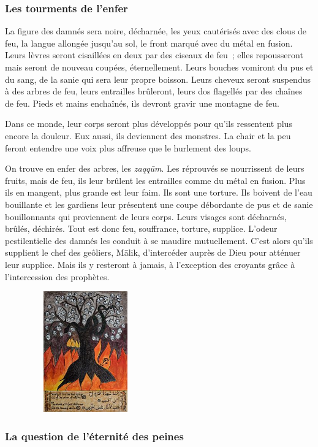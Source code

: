  
\subsubsection{Les tourments de
l'enfer}\label{les-tourments-de-lenfer}

La figure des damnés sera noire, décharnée, les yeux cautérisés avec des
clous de feu, la langue allongée jusqu'au sol, le front marqué avec du
métal en fusion. Leurs lèvres seront cisaillées en deux par des ciseaux
de feu~; elles repousseront mais seront de nouveau coupées,
éternellement. Leurs bouches vomiront du pus et du sang, de la sanie qui
sera leur propre boisson. Leurs cheveux seront suspendus à des arbres de
feu, leurs entrailles brûleront, leurs dos flagellés par des chaînes de
feu. Pieds et mains enchaînés, ils devront gravir une montagne de feu.

Dans ce monde, leur corps seront plus développés pour qu'ils ressentent
plus encore la douleur. Eux aussi, ils deviennent des monstres. La chair
et la peu feront entendre une voix plus affreuse que le hurlement des
loups.

On trouve en enfer des arbres, les \emph{zaqqūm}. Les réprouvés se
nourrissent de leurs fruits, mais de feu, ils leur brûlent les
entrailles comme du métal en fusion. Plus ils en mangent, plus grande
est leur faim. Ils sont une torture. Ils boivent de l'eau bouillante et
les gardiens leur présentent une coupe débordante de pus et de sanie
bouillonnants qui proviennent de leurs corps. Leurs visages sont
décharnés, brûlés, déchirés. Tout est donc feu, souffrance, torture,
supplice. L'odeur pestilentielle des damnés les conduit à se maudire
mutuellement. C'est alors qu'ils supplient le chef des geôliers, Mālik,
d'intercéder auprès de Dieu pour atténuer leur supplice. Mais ils y
resteront à jamais, à l'exception des croyants grâce à l'intercession
des prophètes.

\includegraphics[width=2.73901in,height=2.05312in]{Images/Zaqqum.jpg}


\subsubsection{La question de l'éternité des
peines}\label{la-question-de-luxe9ternituxe9-des-peines}

